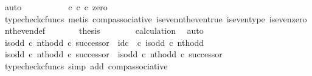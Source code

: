 \begin{isabellebody}
\ auto\isanewline
\ \ \ \ \isamarkupfalse%
\ \isamarkupfalse%
\ {\isachardoublequoteopen}{\isachardot}{\kern0pt}{\isachardot}{\kern0pt}{\isachardot}{\kern0pt}\ {\isacharequal}{\kern0pt}\ {\isacharparenleft}{\kern0pt}{\isasymt}\ {\isasymcirc}\isactrlsub c\ {\isasymbeta}\isactrlbsub {\isasymnat}\isactrlsub c\isactrlesub {\isacharparenright}{\kern0pt}\ {\isasymcirc}\isactrlsub c\ zero{\isachardoublequoteclose}\isanewline
\ \ \ \ \ \ \isamarkupfalse%
\ {\isacharparenleft}{\kern0pt}typecheck{\isacharunderscore}{\kern0pt}cfuncs{\isacharcomma}{\kern0pt}\ metis\ comp{\isacharunderscore}{\kern0pt}associative{}\ is{\isacharunderscore}{\kern0pt}even{\isacharunderscore}{\kern0pt}nth{\isacharunderscore}{\kern0pt}even{\isacharunderscore}{\kern0pt}true\ is{\isacharunderscore}{\kern0pt}even{\isacharunderscore}{\kern0pt}type\ is{\isacharunderscore}{\kern0pt}even{\isacharunderscore}{\kern0pt}zero\ nth{\isacharunderscore}{\kern0pt}even{\isacharunderscore}{\kern0pt}def{}{\isacharparenright}{\kern0pt}\isanewline
\ \ \ \ \isamarkupfalse%
\ \isamarkupfalse%
\ {\isacharquery}{\kern0pt}thesis\isanewline
\ \ \ \ \ \ \isamarkupfalse%
\ calculation\ \isamarkupfalse%
\ auto\isanewline
\ \ \isamarkupfalse%
\isanewline
\isanewline
\ \ \isamarkupfalse%
\ {\isachardoublequoteopen}{\isacharparenleft}{\kern0pt}is{\isacharunderscore}{\kern0pt}odd\ {\isasymcirc}\isactrlsub c\ nth{\isacharunderscore}{\kern0pt}odd{\isacharparenright}{\kern0pt}\ {\isasymcirc}\isactrlsub c\ successor\ {\isacharequal}{\kern0pt}\ id\isactrlsub c\ {\isasymOmega}\ {\isasymcirc}\isactrlsub c\ is{\isacharunderscore}{\kern0pt}odd\ {\isasymcirc}\isactrlsub c\ nth{\isacharunderscore}{\kern0pt}odd{\isachardoublequoteclose}\isanewline
\ \ \isamarkupfalse%
\ {\isacharminus}{\kern0pt}\isanewline
\ \ \ \ \isamarkupfalse%
\ {\isachardoublequoteopen}{\isacharparenleft}{\kern0pt}is{\isacharunderscore}{\kern0pt}odd\ {\isasymcirc}\isactrlsub c\ nth{\isacharunderscore}{\kern0pt}odd{\isacharparenright}{\kern0pt}\ {\isasymcirc}\isactrlsub c\ successor\ {\isacharequal}{\kern0pt}\ is{\isacharunderscore}{\kern0pt}odd\ {\isasymcirc}\isactrlsub c\ nth{\isacharunderscore}{\kern0pt}odd\ {\isasymcirc}\isactrlsub c\ successor{\isachardoublequoteclose}\isanewline
\ \ \ \ \ \ \isamarkupfalse%
\ {\isacharparenleft}{\kern0pt}typecheck{\isacharunderscore}{\kern0pt}cfuncs{\isacharcomma}{\kern0pt}\ simp\ add{\isacharcolon}{\kern0pt}\ comp{\isacharunderscore}{\kern0pt}associative{}{\isacharparenright}{\kern0pt}\isanewline

\end{isabellebody}
